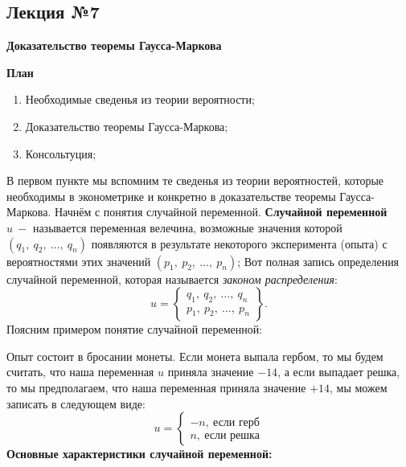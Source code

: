 \documentclass[12pt,a4paper]{article}
\author{Аверьянов Тимофей, Корякин Алексей}
\begin{document}
\begin{center}
\section*{Лекция №7}
\textbf{Доказательство теоремы Гаусса-Маркова}

\textbf{План}
\end{center}

\begin{enumerate}
\item Необходимые сведенья из теории вероятности;
\item Доказательство теоремы Гаусса-Маркова;
\item Консольтуция;
\end{enumerate}

В первом пункте мы вспомним те сведенья из теории вероятностей, которые необходимы в эконометрике и конкретно в доказательстве теоремы Гаусса-Маркова. Начнём с понятия случайной переменной. \textbf{Случайной переменной }$\displaystyle u\ -$ называется переменная велечина, возможные значения которой $\displaystyle ( q_{1} ,\ q_{2} ,\ \dotsc ,\ q_{n})$ появляются в результате некоторого эксперимента (опыта) с вероятностями этих значений $\displaystyle ( p_{1} ,\ p_{2} ,\ \dotsc ,\ p_{n})$; Вот полная запись определения случайной переменной, которая называется \textit{законом распределения}:
\begin{equation*}
u=\begin{Bmatrix}
q_{1} ,\ q_{2} ,\ \dotsc ,\ q_{n}\\
p_{1} ,\ p_{2} ,\ \dotsc ,\ p_{n}
\end{Bmatrix} .
\end{equation*}
Поясним примером понятие случайной переменной:

Опыт состоит в бросании монеты. Если монета выпала гербом, то мы будем считать, что наша переменная $\displaystyle u$ приняла значение $\displaystyle -14$, а если выпадает решка, то мы предполагаем, что наша переменная приняла значение $\displaystyle +14$, мы можем записать в следующем виде:
\begin{equation*}
u=\begin{cases}
-n,\ \text{если герб}\\
n,\ \text{если решка}
\end{cases}
\end{equation*}
\textbf{Основные характеристики случайной переменной:}
\end{document}
